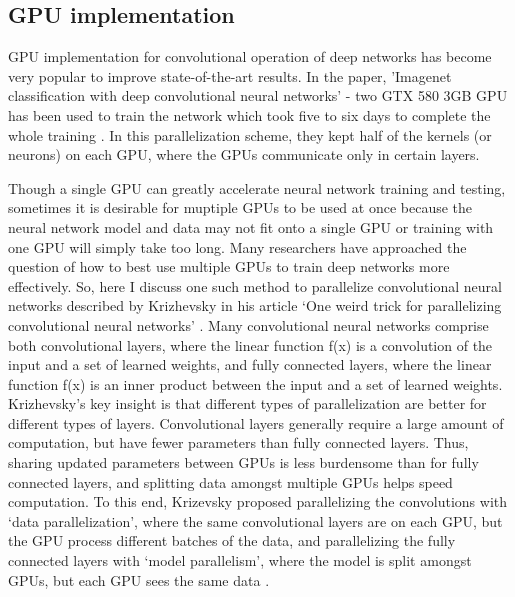 \documentclass[11pt]{article}       %
\begin{document}
\subsection{GPU implementation} \label{GPUimpl}
GPU implementation for convolutional operation of deep networks has become very popular to improve state-of-the-art results. In the paper, 'Imagenet classification with deep convolutional neural networks' - two GTX 580 3GB GPU has been used to train the network which took five to six days to complete the whole training \cite{dr5}. In this parallelization scheme, they kept half of the kernels (or neurons) on each GPU, where the GPUs communicate only in certain layers.

Though a single GPU can greatly accelerate neural network training and testing, sometimes it is desirable
for muptiple GPUs to be used at once because the neural network model and data may not fit onto a single GPU or training with one GPU will simply take too long. Many researchers have approached the question of how to best use multiple GPUs to train deep networks more effectively. So, here I discuss one such method to parallelize convolutional neural networks described by Krizhevsky in his article ‘One weird trick for parallelizing convolutional neural networks’ \cite{dr4}. Many convolutional neural networks comprise both convolutional layers, where the linear function f(x) is a convolution of the input and a set of
learned weights, and fully connected layers, where the linear function f(x) is an inner product between the input and a set of learned weights. Krizhevsky’s key insight is that different types of parallelization are better for different types of layers. Convolutional layers generally require a large amount of computation, but have fewer parameters than fully connected layers. Thus, sharing updated parameters between GPUs is less burdensome than for fully connected layers, and splitting data amongst multiple GPUs helps speed computation. To this end, Krizevsky proposed parallelizing the convolutions with ‘data parallelization’, where the same convolutional layers are on each GPU, but the GPU process different batches of the data, and parallelizing the fully connected layers with ‘model parallelism’, where the model is split amongst GPUs, but each GPU sees the same data \cite{dr4}.




\end{document}
